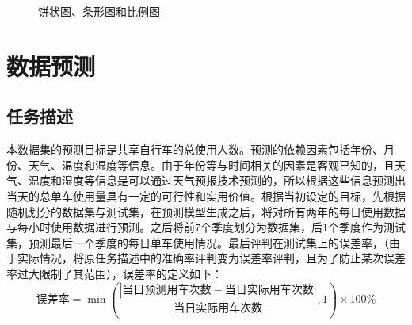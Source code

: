 \documentclass[CJK]{ctexart}
\begin{document}
    \begin{figure}[htbp]
        \centering
        \centering
        \caption{饼状图、条形图和比例图}
    \end{figure}

\section{数据预测}
\subsection{任务描述}
本数据集的预测目标是共享自行车的总使用人数。预测的依赖因素包括年份、月份、天气、温度和湿度等信息。由于年份等与时间相关的因素是客观已知的，且天气、温度和湿度等信息是可以通过天气预报技术预测的，所以根据这些信息预测出当天的总单车使用量具有一定的可行性和实用价值。根据当初设定的目标，先根据随机划分的数据集与测试集，在预测模型生成之后，将对所有两年的每日使用数据与每小时使用数据进行预测。之后将前7个季度划分为数据集，后1个季度作为测试集，预测最后一个季度的每日单车使用情况。最后评判在测试集上的误差率，（由于实际情况，将原任务描述中的准确率评判变为误差率评判，且为了防止某次误差率过大限制了其范围），误差率的定义如下：
$$\mbox{误差率}=\min(\frac{|\mbox{当日预测用车次数}-\mbox{当日实际用车次数}|}{\mbox{当日实际用车次数}},1)\times 100\%$$
\end{document}
